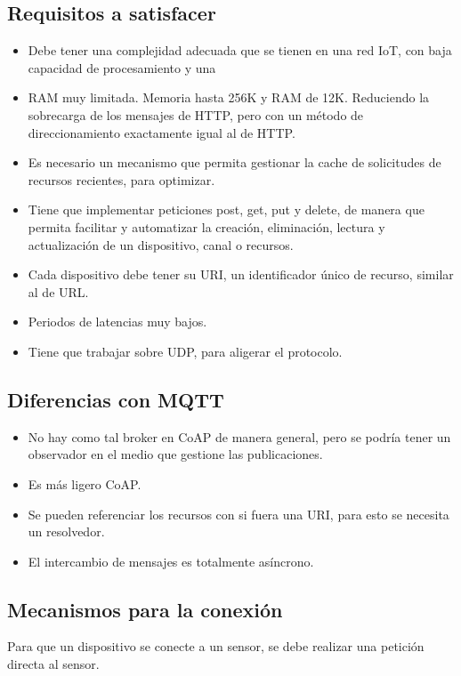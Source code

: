 \documentclass[12pt]{report} %
\begin{document}
\subsection{Requisitos a satisfacer}
	\begin{itemize}
		\item Debe tener una complejidad adecuada que se tienen en una red IoT, con baja capacidad de procesamiento y una 	
		\item RAM muy limitada. Memoria hasta 256K y RAM de 12K. Reduciendo la sobrecarga de los mensajes de HTTP, pero con un método de direccionamiento exactamente igual al de HTTP.
		\item Es necesario un mecanismo que permita gestionar la cache de solicitudes de recursos recientes, para optimizar.
		\item Tiene que implementar peticiones post, get, put y delete, de manera que permita facilitar y automatizar la creación, eliminación, lectura y actualización de un dispositivo, canal o recursos.
		\item Cada dispositivo debe tener su URI, un identificador único de recurso, similar al de URL.
		\item Periodos de latencias muy bajos.
		\item Tiene que trabajar sobre UDP, para aligerar el protocolo.
	\end{itemize}

\subsection{Diferencias con MQTT}
\begin{itemize}
	\item No hay como tal broker en CoAP de manera general, pero se podría tener un observador en el medio que gestione las publicaciones.
	\item Es más ligero CoAP.
	\item Se pueden referenciar los recursos con si fuera una URI, para esto se necesita un resolvedor.
	\item El intercambio de mensajes es totalmente asíncrono.
\end{itemize}

\subsection{Mecanismos para la conexión}
Para que un dispositivo se conecte a un sensor, se debe realizar una petición directa al sensor.
\end{document}

